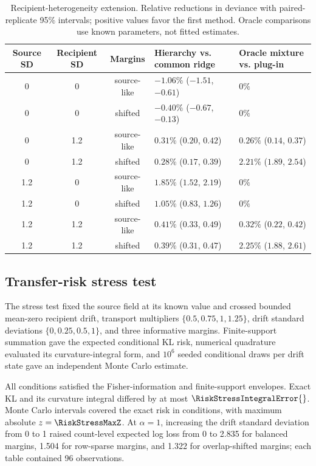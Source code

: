 \documentclass[10pt,a4paper]{article}
\begin{document}
\begin{table}[ht]
\centering\small
\caption{Recipient-heterogeneity extension. Relative reductions in deviance
with paired-replicate 95\% intervals; positive values favor the first method.
Oracle comparisons use known parameters, not fitted estimates.}
\label{tab:s-recipient-heterogeneity}
\begin{tabular}{@{}cccll@{}}
\toprule
Source SD & Recipient SD & Margins & Hierarchy vs. common ridge & Oracle mixture vs. plug-in\\
\midrule
0 & 0 & source-like & $-1.06\%$ ($-1.51$, $-0.61$) & $0\%$\\
0 & 0 & shifted & $-0.40\%$ ($-0.67$, $-0.13$) & $0\%$\\
0 & 1.2 & source-like & $0.31\%$ ($0.20$, $0.42$) & $0.26\%$ ($0.14$, $0.37$)\\
0 & 1.2 & shifted & $0.28\%$ ($0.17$, $0.39$) & $2.21\%$ ($1.89$, $2.54$)\\
1.2 & 0 & source-like & $1.85\%$ ($1.52$, $2.19$) & $0\%$\\
1.2 & 0 & shifted & $1.05\%$ ($0.83$, $1.26$) & $0\%$\\
1.2 & 1.2 & source-like & $0.41\%$ ($0.33$, $0.49$) & $0.32\%$ ($0.22$, $0.42$)\\
1.2 & 1.2 & shifted & $0.39\%$ ($0.31$, $0.47$) & $2.25\%$ ($1.88$, $2.61$)\\
\bottomrule
\end{tabular}
\end{table}

\subsection{Transfer-risk stress test}

The stress test fixed the source field at its known value and crossed bounded mean-zero recipient drift, transport multipliers $\{0.5,0.75,1,1.25\}$, drift standard deviations $\{0,0.25,0.5,1\}$, and three informative margins. Finite-support summation gave the expected conditional KL risk, numerical quadrature evaluated its curvature-integral form, and $10^6$ seeded conditional draws per drift state gave an independent Monte Carlo estimate.

All \RiskStressEnvelopePass{} conditions satisfied the Fisher-information and finite-support envelopes. Exact KL and its curvature integral differed by at most $\RiskStressIntegralError{}$. Monte Carlo intervals covered the exact risk in \RiskStressCoverage{} conditions, with maximum absolute $z=\RiskStressMaxZ$. At $\alpha=1$, increasing the drift standard deviation from 0 to 1 raised count-level expected log loss from 0 to 2.835 for balanced margins, 1.504 for row-sparse margins, and 1.322 for overlap-shifted margins; each table contained 96 observations.
\end{document}
